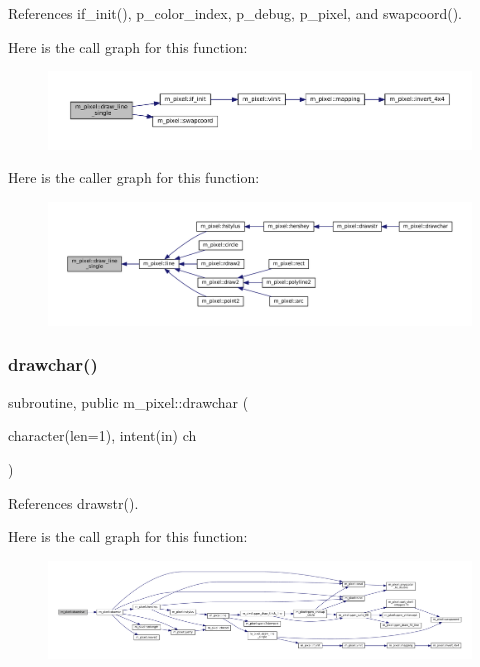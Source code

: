 References if\+\_\+init(), p\+\_\+color\+\_\+index, p\+\_\+debug, p\+\_\+pixel, and swapcoord().

Here is the call graph for this function\+:
\nopagebreak
\begin{figure}[H]
\begin{center}
\leavevmode
\includegraphics[width=350pt]{namespacem__pixel_a42791c7e58158616dae7c36ec5806717_cgraph}
\end{center}
\end{figure}
Here is the caller graph for this function\+:
\nopagebreak
\begin{figure}[H]
\begin{center}
\leavevmode
\includegraphics[width=350pt]{namespacem__pixel_a42791c7e58158616dae7c36ec5806717_icgraph}
\end{center}
\end{figure}
\mbox{\label{namespacem__pixel_a58406ffd6c2a9fdf2ea7772198b54255}} 
\subsubsection{\texorpdfstring{drawchar()}{drawchar()}}
{\footnotesize\ttfamily subroutine, public m\+\_\+pixel\+::drawchar (\begin{DoxyParamCaption}\item[{character(len=1), intent(in)}]{ch }\end{DoxyParamCaption})}



References drawstr().

Here is the call graph for this function\+:
\nopagebreak
\begin{figure}[H]
\begin{center}
\leavevmode
\includegraphics[width=350pt]{namespacem__pixel_a58406ffd6c2a9fdf2ea7772198b54255_cgraph}
\end{center}
\end{figure}
\mbox{\label{namespacem__pixel_a6fa0c2d531d1ac74840aa2f0e2b050e0}} 
